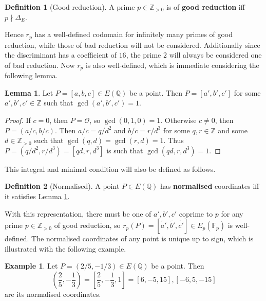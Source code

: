 \documentclass{article}
\newcommand{\F}{\mathbb{F}}
\newcommand{\Z}{\mathbb{Z}}
\newcommand{\Q}{\mathbb{Q}}
\newcommand{\rb}[1]{\left( #1 \right)}
\renewcommand{\sb}[1]{\left[ #1 \right]}
\theoremstyle{definition}\newtheorem*{definition}{Definition}
\theoremstyle{definition}\newtheorem*{example}{Example}
\theoremstyle{definition}\newtheorem*{remark}{Remark}
\newtheorem{lemma}[proposition]{Lemma}
\begin{document}
\begin{definition}[Good reduction]
A prime $ p \in \Z_{> 0} $ is of \textbf{good reduction} iff $ p \nmid \Delta_E $.
\end{definition}

Hence $ r_p $ has a well-defined codomain for infinitely many primes of good reduction, while those of bad reduction will not be considered. Additionally since the discriminant has a coefficient of $ 16 $, the prime $ 2 $ will always be considered one of bad reduction. Now $ r_p $ is also well-defined, which is immediate considering the following lemma.

\begin{lemma}
\label{lem:normalise}
Let $ P = \sb{a, b, c} \in E\rb{\Q} $ be a point. Then $ P = \sb{a', b', c'} $ for some $ a', b', c' \in \Z $ such that $ \gcd\rb{a', b', c'} = 1 $.
\end{lemma}

\begin{proof}
If $ c = 0 $, then $ P = \mathcal{O} $, so $ \gcd\rb{0, 1, 0} = 1 $. Otherwise $ c \ne 0 $, then $ P = \rb{a / c, b / c} $. Then $ a / c = q / d^2 $ and $ b / c = r / d^3 $ for some $ q, r \in \Z $ and some $ d \in \Z_{> 0} $ such that $ \gcd\rb{q, d} = \gcd\rb{r, d} = 1 $. Thus $ P = \rb{q / d^2, r / d^3} = \sb{qd, r, d^3} $ is such that $ \gcd\rb{qd, r, d^3} = 1 $.
\end{proof}

This integral and minimal condition will also be defined as follows.

\begin{definition}[Normalised]
A point $ P \in E\rb{\Q} $ has \textbf{normalised} coordinates iff it satisfies Lemma \ref{lem:normalise}.
\end{definition}

With this representation, there must be one of $ a', b', c' $ coprime to $ p $ for any prime $ p \in \Z_{> 0} $ of good reduction, so $ r_p\rb{P} = \sb{\tilde{a'}, \tilde{b'}, \tilde{c'}} \in E_p\rb{\F_p} $ is well-defined. The normalised coordinates of any point is unique up to sign, which is illustrated with the following example.

\begin{example}
Let $ P = \rb{2 / 5, -1 / 3} \in E\rb{\Q} $ be a point. Then
$$ \rb{\dfrac{2}{5}, -\dfrac{1}{3}} = \sb{\dfrac{2}{5}, -\dfrac{1}{3}, 1} = \sb{6, -5, 15}, \sb{-6, 5, -15} $$
are its normalised coordinates.
\end{example}
\end{document}
